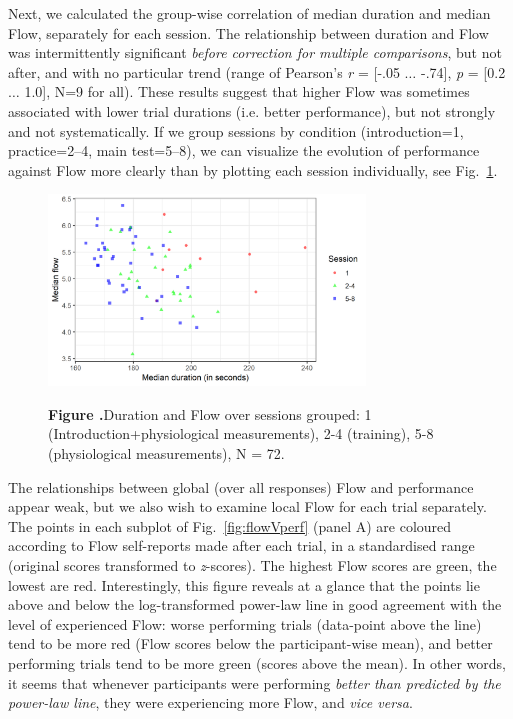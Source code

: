 \documentclass{frontierstyle/frontiersSCNS}
\newcommand{\nicewidth}{0.75\textwidth}
\begin{document}
Next, we calculated the group-wise correlation of median duration and median Flow, separately for each session. The relationship between duration and Flow was intermittently significant {\it before correction for multiple comparisons}, but not after, and with no particular trend (range of Pearson's {\it r} = [-.05 $\dots$ -.74], {\it p} = [0.2 $\dots$ 1.0], N=9 for all). These results suggest that higher Flow was sometimes associated with lower trial durations (i.e. better performance), but not strongly and not systematically. If we group sessions by condition (introduction=1, practice=2--4, main test=5--8), we can visualize the evolution of performance against Flow more clearly than by plotting each session individually, see Fig.~\ref{fig:FlowVdurXssn}.%

\begin{figure}[!t]
\begin{center}
  \includegraphics[width=\nicewidth]{session_flowDuration_v3}
\end{center}
  \textbf{\label{fig:FlowVdurXssn} Figure .}{Duration and Flow over sessions grouped: 1 (Introduction+physiological measurements), 2-4 (training), 5-8 (physiological measurements), N = 72.}
\end{figure}

The relationships between global (over all responses) Flow and performance appear weak, but we also wish to examine local Flow for each trial separately. The points in each subplot of Fig.~\ref{fig:flowVperf} (panel A) are coloured according to Flow self-reports made after each trial, in a standardised range (original scores transformed to {\it z}-scores). The highest Flow scores are green, the lowest are red. Interestingly, this figure reveals at a glance that the points lie above and below the log-transformed power-law line in good agreement with the level of experienced Flow: worse performing trials (data-point above the line) tend to be more red (Flow scores below the participant-wise mean), and better performing trials tend to be more green (scores above the mean). In other words, it seems that whenever participants were performing {\it better than predicted by the power-law line}, they were experiencing more Flow, and {\it vice versa}.
\end{document}
